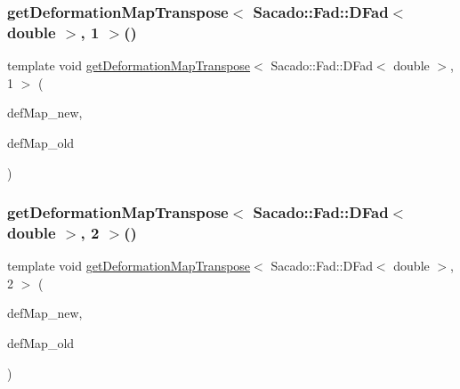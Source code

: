 \mbox{\label{function_evaluations_8cc_a57b94bf3e5309492433be576f3e57c03}} 
\subsubsection{\texorpdfstring{get\+Deformation\+Map\+Transpose$<$ Sacado\+::\+Fad\+::\+D\+Fad$<$ double $>$, 1 $>$()}{getDeformationMapTranspose< Sacado::Fad::DFad< double >, 1 >()}}
{\footnotesize\ttfamily template void \mbox{\hyperlink{group___evaluation_functions_gad4003712a2346a79e13bdbfcad4d1e1c}{get\+Deformation\+Map\+Transpose}}$<$ Sacado\+::\+Fad\+::\+D\+Fad$<$ double $>$, 1 $>$ (\begin{DoxyParamCaption}\item[{\mbox{\hyperlink{structdeformation_map}{deformation\+Map}}$<$ Sacado\+::\+Fad\+::\+D\+Fad$<$ double $>$, 1 $>$ \&}]{def\+Map\+\_\+new,  }\item[{\mbox{\hyperlink{structdeformation_map}{deformation\+Map}}$<$ Sacado\+::\+Fad\+::\+D\+Fad$<$ double $>$, 1 $>$ \&}]{def\+Map\+\_\+old }\end{DoxyParamCaption})}

\mbox{\label{function_evaluations_8cc_a4ddf5fdc58a19c93899099e38e4a2125}} 
\subsubsection{\texorpdfstring{get\+Deformation\+Map\+Transpose$<$ Sacado\+::\+Fad\+::\+D\+Fad$<$ double $>$, 2 $>$()}{getDeformationMapTranspose< Sacado::Fad::DFad< double >, 2 >()}}
{\footnotesize\ttfamily template void \mbox{\hyperlink{group___evaluation_functions_gad4003712a2346a79e13bdbfcad4d1e1c}{get\+Deformation\+Map\+Transpose}}$<$ Sacado\+::\+Fad\+::\+D\+Fad$<$ double $>$, 2 $>$ (\begin{DoxyParamCaption}\item[{\mbox{\hyperlink{structdeformation_map}{deformation\+Map}}$<$ Sacado\+::\+Fad\+::\+D\+Fad$<$ double $>$, 2 $>$ \&}]{def\+Map\+\_\+new,  }\item[{\mbox{\hyperlink{structdeformation_map}{deformation\+Map}}$<$ Sacado\+::\+Fad\+::\+D\+Fad$<$ double $>$, 2 $>$ \&}]{def\+Map\+\_\+old }\end{DoxyParamCaption})}

